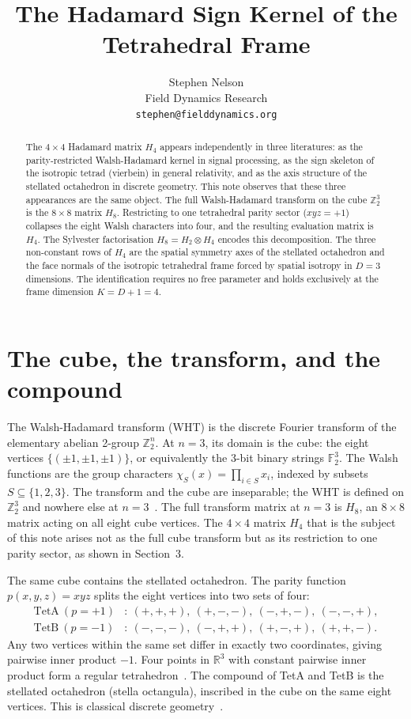 \documentclass[11pt]{article}
\title{The Hadamard Sign Kernel of the Tetrahedral Frame}
\author{Stephen Nelson\\
\small Field Dynamics Research\\
\small\texttt{stephen@fielddynamics.org}}
\date{}
\begin{document}
\maketitle

\begin{abstract}
The $4\times 4$ Hadamard matrix $H_4$ appears independently in
three literatures: as the parity-restricted Walsh-Hadamard kernel
in signal processing, as the sign skeleton of the isotropic tetrad
(vierbein) in general relativity, and as the axis structure of the
stellated octahedron in discrete geometry.  This note observes that
these three appearances are the same object.  The full
Walsh-Hadamard transform on the cube $\mathbb Z_2^3$ is the
$8\times 8$ matrix $H_8$.  Restricting to one tetrahedral parity
sector ($xyz=+1$) collapses the eight Walsh characters into four,
and the resulting evaluation matrix is $H_4$.  The Sylvester
factorisation $H_8=H_2\otimes H_4$ encodes this decomposition.
The three non-constant rows of $H_4$ are the spatial symmetry axes
of the stellated octahedron and the face normals of the isotropic
tetrahedral frame forced by spatial isotropy in $D=3$ dimensions.
The identification requires no free parameter and holds exclusively
at the frame dimension $K=D+1=4$.
\end{abstract}


\section{The cube, the transform, and the compound}

The Walsh-Hadamard transform (WHT) is the discrete Fourier
transform of the elementary abelian 2-group $\mathbb Z_2^n$.  At
$n=3$, its domain is the cube: the eight vertices
$\{(\pm1,\pm1,\pm1)\}$, or equivalently the 3-bit binary strings
$\mathbb F_2^3$.  The Walsh functions are the group characters
$\chi_S(x) = \prod_{i\in S} x_i$, indexed by subsets
$S\subseteq\{1,2,3\}$.  The transform and the cube are
inseparable; the WHT is defined on $\mathbb Z_2^3$ and nowhere
else at $n=3$~\cite{Walsh,Sylvester}.  The full transform matrix
at $n=3$ is $H_8$, an $8\times 8$ matrix acting on all eight cube
vertices.  The $4\times 4$ matrix $H_4$ that is the subject of
this note arises not as the full cube transform but as its
restriction to one parity sector, as shown in Section~3.

The same cube contains the stellated octahedron.  The parity
function $p(x,y,z) = xyz$ splits the eight vertices into two sets
of four:
\begin{align*}
\text{TetA}\ (p=+1)&\colon\
(+,+,+),\ (+,-,-),\ (-,+,-),\ (-,-,+),\\
\text{TetB}\ (p=-1)&\colon\
(-,-,-),\ (-,+,+),\ (+,-,+),\ (+,+,-).
\end{align*}
Any two vertices within the same set differ in exactly two
coordinates, giving pairwise inner product $-1$.  Four points in
$\mathbb R^3$ with constant pairwise inner product form a regular
tetrahedron~\cite{Coxeter}.  The compound of TetA and TetB is the
stellated octahedron (stella octangula), inscribed in the cube on
the same eight vertices.  This is classical discrete
geometry~\cite{Kepler,Coxeter}.
\end{document}
